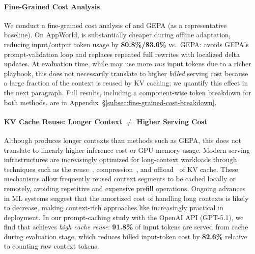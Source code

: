 \paragraph{Fine-Grained Cost Analysis} 
We conduct a fine-grained cost analysis of \name and GEPA (as a representative baseline).
On AppWorld, \name is substantially cheaper during offline adaptation, reducing input/output token usage by \textbf{80.8\%/83.6\%} vs.~GEPA: \name avoids GEPA's prompt-validation loop and replaces repeated full rewrites with localized delta updates.
At evaluation time, while \name may use more \emph{raw} input tokens due to a richer playbook, this does not necessarily translate to higher \emph{billed} serving cost because a large fraction of the context is reused by KV caching; we quantify this effect in the next paragraph.
Full results, including a component-wise token breakdown for both methods, are in Appendix~\S\ref{subsec:fine-grained-cost-breakdown}.

\paragraph{KV Cache Reuse: Longer Context $\ne$ Higher Serving Cost} 
Although \name produces longer contexts than methods such as GEPA, this does not translate to linearly higher inference cost or GPU memory usage.  
Modern serving infrastructures are increasingly optimized for long-context workloads through techniques such as the reuse~\citep{gim2024prompt, yao2025cacheblend}, compression~\citep{liu2024kivi, liu2024cachegen}, and offload~\citep{lee2024infinigen, li2025continuum} of KV cache.  
These mechanisms allow frequently reused context segments to be cached locally or remotely, avoiding repetitive and expensive prefill operations.  
Ongoing advances in ML systems suggest that the amortized cost of handling long contexts is likely to decrease, making context-rich approaches like \name increasingly practical in deployment. 
In our prompt-caching study with the OpenAI API (GPT-5.1), we find that \name achieves \emph{high cache reuse}: \textbf{91.8\%} of input tokens are served from cache during evaluation stage, which reduces billed input-token cost by \textbf{82.6\%} relative to counting raw context tokens.